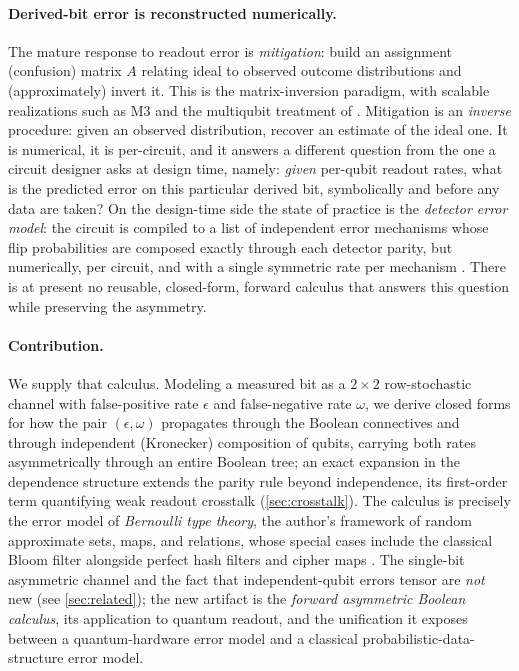 \documentclass[12pt]{article}
\numberwithin{equation}{section}
\theoremstyle{plain}
\theoremstyle{definition}
\theoremstyle{remark}
\newcommand{\eps}{\epsilon}
\begin{document}
\paragraph{Derived-bit error is reconstructed numerically.} The mature response
to readout error is \emph{mitigation}: build an assignment (confusion) matrix $A$
relating ideal to observed outcome distributions and (approximately) invert it.
This is the matrix-inversion paradigm, with scalable realizations such as M3
\citep{nation2021m3} and the multiqubit treatment of \citet{bravyi2021mitigating}.
Mitigation is an \emph{inverse} procedure: given an observed distribution, recover
an estimate of the ideal one. It is numerical, it is per-circuit, and it answers
a different question from the one a circuit designer asks at design time, namely:
\emph{given} per-qubit readout rates, what is the predicted error on this
particular derived bit, symbolically and before any data are taken? On the
design-time side the state of practice is the \emph{detector error model}: the
circuit is compiled to a list of independent error mechanisms whose flip
probabilities are composed exactly through each detector parity, but
numerically, per circuit, and with a single symmetric rate per mechanism
\citep{gidney2021stim}. There is at
present no reusable, closed-form, forward calculus that answers this question
while preserving the asymmetry.

\paragraph{Contribution.} We supply that calculus. Modeling a measured bit as a
$2\times2$ row-stochastic channel with false-positive rate $\eps$ and
false-negative rate $\omega$, we derive closed forms for how the pair
$(\eps,\omega)$ propagates through the Boolean connectives and through
independent (Kronecker) composition of qubits, carrying both rates
asymmetrically through an entire Boolean tree; an exact expansion in the
dependence structure extends the parity rule beyond independence, its
first-order term quantifying weak readout crosstalk (\cref{sec:crosstalk}). The calculus is precisely the
error model of \emph{Bernoulli type theory}, the author's framework of random
approximate sets, maps, and relations, whose special cases include the classical
Bloom filter \citep{bloom1970} alongside perfect hash filters and
cipher maps \citep{bernoulliSets,bernoulliComposition,bernoulliMaps}.
The single-bit asymmetric channel and the fact that independent-qubit errors
tensor are \emph{not} new (see \cref{sec:related}); the new artifact is the
\emph{forward asymmetric Boolean calculus}, its application to quantum readout,
and the unification it exposes between a quantum-hardware error model and a
classical probabilistic-data-structure error model.
\end{document}
